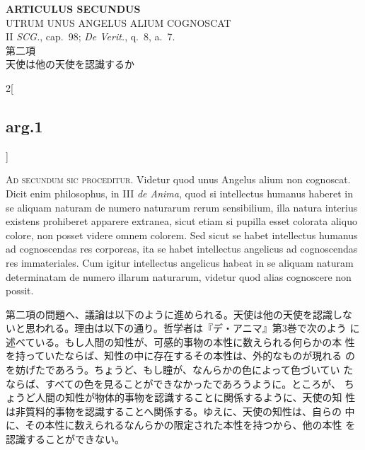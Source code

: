 \documentclass[paper=a4paper,fontsize=10pt,jafontsize=9pt,titlepage]{jlreq}
\begin{document}
\newpage
{}
{}
\setcounter{section}{2}
\setcounter{subsection}{0}




\begin{center}
{\Large {\bfseries ARTICULUS SECUNDUS}}\\ {\large UTRUM UNUS ANGELUS ALIUM
COGNOSCAT}\\ {\footnotesize II {\itshape SCG.}, cap.~98; {\itshape De
Verit.}, q.~8, a.~7.}\\ {\Large 第二項\\天使は他の天使を認識するか}
\end{center}

\begin{paracol}{2}[\subsection{arg.1}]

{\huge A}{\scshape d secundum sic proceditur}. Videtur quod unus
Angelus alium non cognoscat. Dicit enim philosophus, in III {\itshape
de Anima}, quod si intellectus humanus haberet in se aliquam naturam
de numero naturarum rerum sensibilium, illa natura interius existens
prohiberet apparere extranea, sicut etiam si pupilla esset colorata
aliquo colore, non posset videre omnem colorem. Sed sicut se habet
intellectus humanus ad cognoscendas res corporeas, ita se habet
intellectus angelicus ad cognoscendas res immateriales. Cum igitur
intellectus angelicus habeat in se aliquam naturam determinatam de
numero illarum naturarum, videtur quod alias cognoscere non possit.

\switchcolumn

第二項の問題へ、議論は以下のように進められる。天使は他の天使を認識しな
いと思われる。理由は以下の通り。哲学者は『デ・アニマ』第3巻で次のよう
に述べている。もし人間の知性が、可感的事物の本性に数えられる何らかの本
性を持っていたならば、知性の中に存在するその本性は、外的なものが現れる
のを妨げたであろう。ちょうど、もし瞳が、なんらかの色によって色づいてい
たならば、すべての色を見ることができなかったであろうように。ところが、
ちょうど人間の知性が物体的事物を認識することに関係するように、天使の知
性は非質料的事物を認識することへ関係する。ゆえに、天使の知性は、自らの
中に、その本性に数えられるなんらかの限定された本性を持つから、他の本性
を認識することができない。



\end{paracol}
\end{document}

